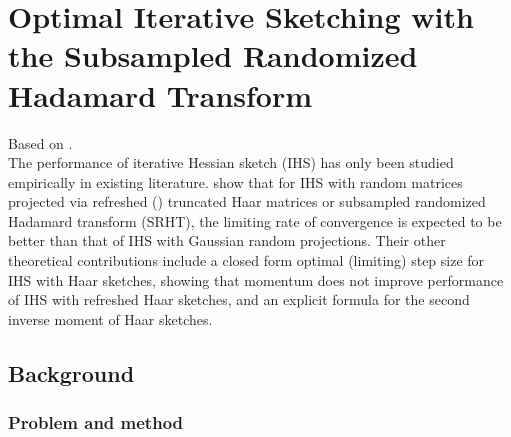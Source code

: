\documentclass[10pt]{article}
\begin{document}
\tableofcontents


\newpage


\section{Optimal Iterative Sketching with the Subsampled Randomized Hadamard Transform}

Based on \citep{Lacotte:2020}.
\\

The performance of iterative Hessian sketch (IHS) has only been studied empirically in existing literature. \citet{Lacotte:2020} show that for IHS with random matrices projected via refreshed (\iid) truncated Haar matrices or subsampled randomized Hadamard transform (SRHT), the limiting rate of convergence is expected to be better than that of IHS with Gaussian random projections. Their other theoretical contributions include a closed form optimal (limiting) step size for IHS with Haar sketches, showing that momentum does not improve performance of IHS with refreshed Haar sketches, and an explicit formula for the second inverse moment of Haar sketches.

\subsection{Background}

\subsubsection{Problem and method}
\end{document}
